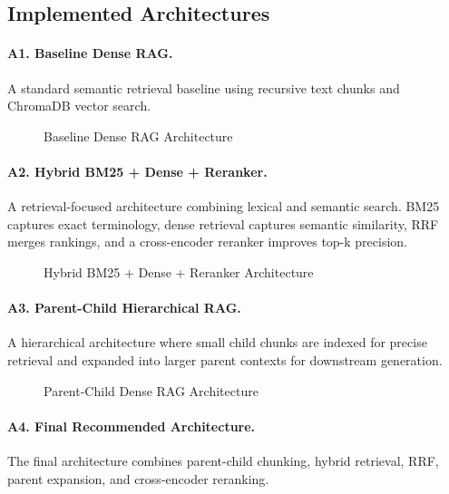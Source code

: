 \documentclass[11pt]{article}
\begin{document}
\subsection{Implemented Architectures}

\paragraph{A1. Baseline Dense RAG.}
A standard semantic retrieval baseline using recursive text chunks and ChromaDB vector search.

\begin{figure}[H]
    \centering
    
    \caption{Baseline Dense RAG Architecture}
    \label{fig:a1_baseline_dense_rag}
\end{figure}

\paragraph{A2. Hybrid BM25 + Dense + Reranker.}
A retrieval-focused architecture combining lexical and semantic search. BM25 captures exact terminology, dense retrieval captures semantic similarity, RRF merges rankings, and a cross-encoder reranker improves top-k precision.

\begin{figure}[H]
    \centering
    
    \caption{Hybrid BM25 + Dense + Reranker Architecture}
    \label{fig:a2_hybrid_bm25_dense_reranker}
\end{figure}

\paragraph{A3. Parent-Child Hierarchical RAG.}
A hierarchical architecture where small child chunks are indexed for precise retrieval and expanded into larger parent contexts for downstream generation.

\begin{figure}[H]
    \centering
    
    \caption{Parent-Child Dense RAG Architecture}
    \label{fig:a3_parent_child_dense_rag}
\end{figure}

\paragraph{A4. Final Recommended Architecture.}
The final architecture combines parent-child chunking, hybrid retrieval, RRF, parent expansion, and cross-encoder reranking.
\end{document}
